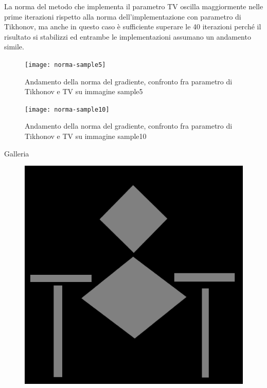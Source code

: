 \documentclass[12pt]{article}
\begin{document}
    La norma del metodo che implementa il parametro TV oscilla maggiormente nelle prime iterazioni rispetto alla norma dell'implementazione con parametro di Tikhonov, ma anche in questo caso è sufficiente superare le 40 iterazioni perché il risultato si stabilizzi ed entrambe le implementazioni assumano un andamento simile.

    \begin{figure}[h!]
    \centering
    \texttt{[image: norma-sample5]}
    \caption{Andamento della norma del gradiente, confronto fra parametro di Tikhonov e TV su immagine sample5}
    \label{graph:5}
    \end{figure}

%
\makeatletter
\setlength{\@fptop}{0pt}
\makeatother
%
    \begin{figure}[t!]
    \centering
    \texttt{[image: norma-sample10]}
    \caption{Andamento della norma del gradiente, confronto fra parametro di Tikhonov e TV su immagine sample10}
    \label{graph:6}
    \end{figure}

    \clearpage
    \listoffigures
    \newpage
    \listoftables

\cleardoublepage
    \centering
    \huge
    Galleria
\cleardoublepage

    \begin{figure}[h!]
    \centering
    \includegraphics[width=14cm]{sample1}
    \end{figure}
    \newpage
\end{document}
